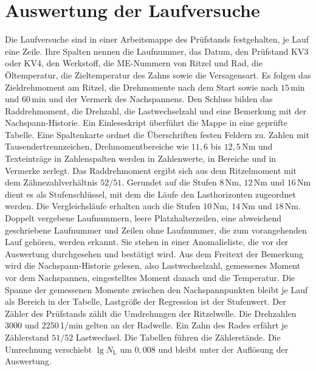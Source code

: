 \section{Auswertung der Laufversuche}
\label{sec:auswertung_laufversuche}

Die Laufversuche sind in einer Arbeitsmappe des Prüfstands festgehalten, je Lauf eine Zeile. Ihre Spalten nennen die Laufnummer, das Datum, den Prüfstand KV3 oder KV4, den Werkstoff, die ME-Nummern von Ritzel und Rad, die Öltemperatur, die Zieltemperatur des Zahns sowie die Versagensart. Es folgen das Zieldrehmoment am Ritzel, die Drehmomente nach dem Start sowie nach $15$\,min und $60$\,min und der Vermerk des Nachspannens. Den Schluss bilden das Raddrehmoment, die Drehzahl, die Lastwechselzahl und eine Bemerkung mit der Nachspann-Historie. Ein Einleseskript überführt die Mappe in eine geprüfte Tabelle. Eine Spaltenkarte ordnet die Überschriften festen Feldern zu. Zahlen mit Tausendertrennzeichen, Drehmomentbereiche wie $11{,}6$ bis $12{,}5$\,Nm und Texteinträge in Zahlenspalten werden in Zahlenwerte, in Bereiche und in Vermerke zerlegt. Das Raddrehmoment ergibt sich aus dem Ritzelmoment mit dem Zähnezahlverhältnis $52/51$. Gerundet auf die Stufen $8$\,Nm, $12$\,Nm und $16$\,Nm dient es als Stufenschlüssel, mit dem die Läufe den Lasthorizonten zugeordnet werden. Die Vergleichsläufe erhalten auch die Stufen $10$\,Nm, $14$\,Nm und $18$\,Nm. Doppelt vergebene Laufnummern, leere Platzhalterzeilen, eine abweichend geschriebene Laufnummer und Zeilen ohne Laufnummer, die zum vorangehenden Lauf gehören, werden erkannt. Sie stehen in einer Anomalieliste, die vor der Auswertung durchgesehen und bestätigt wird. Aus dem Freitext der Bemerkung wird die Nachspann-Historie gelesen, also Lastwechselzahl, gemessenes Moment vor dem Nachspannen, eingestelltes Moment danach und die Temperatur. Die Spanne der gemessenen Momente zwischen den Nachspannpunkten bleibt je Lauf als Bereich in der Tabelle, Lastgröße der Regression ist der Stufenwert. Der Zähler des Prüfstands zählt die Umdrehungen der Ritzelwelle. Die Drehzahlen $3000$ und $2250$\,1/min gelten an der Radwelle. Ein Zahn des Rades erfährt je Zählerstand $51/52$ Lastwechsel. Die Tabellen führen die Zählerstände. Die Umrechnung verschiebt $\lg N_{\mathrm{L}}$ um $0{,}008$ und bleibt unter der Auflösung der Auswertung.

